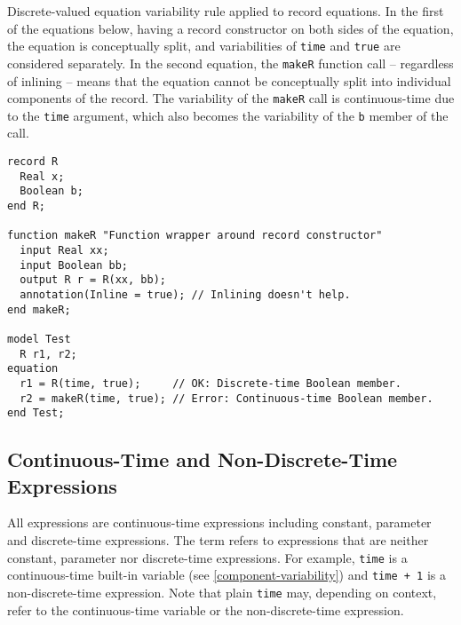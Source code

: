 \begin{example}
Discrete-valued equation variability rule applied to record equations.
In the first of the equations below, having a record constructor on both sides of the equation, the equation is conceptually split, and variabilities of \lstinline!time! and \lstinline!true! are considered separately.
In the second equation, the \lstinline!makeR! function call -- regardless of inlining -- means that the equation cannot be conceptually split into individual components of the record.
The variability of the \lstinline!makeR! call is continuous-time due to the \lstinline!time! argument, which also becomes the variability of the \lstinline!b! member of the call.
\begin{lstlisting}[language=modelica]
record R
  Real x;
  Boolean b;
end R;

function makeR "Function wrapper around record constructor"
  input Real xx;
  input Boolean bb;
  output R r = R(xx, bb);
  annotation(Inline = true); // Inlining doesn't help.
end makeR;

model Test
  R r1, r2;
equation
  r1 = R(time, true);     // OK: Discrete-time Boolean member.
  r2 = makeR(time, true); // Error: Continuous-time Boolean member.
end Test;
\end{lstlisting}
\end{example}

\subsection{Continuous-Time and Non-Discrete-Time Expressions}\label{continuous-time-expressions}

All expressions are continuous-time expressions including constant, parameter and discrete-time expressions.
The term  refers to expressions that are neither constant, parameter nor discrete-time expressions.
For example, \lstinline!time! is a continuous-time built-in variable (see \cref{component-variability}) and \lstinline!time + 1! is a non-discrete-time expression.
Note that plain \lstinline!time! may, depending on context, refer to the continuous-time variable or the non-discrete-time expression.
